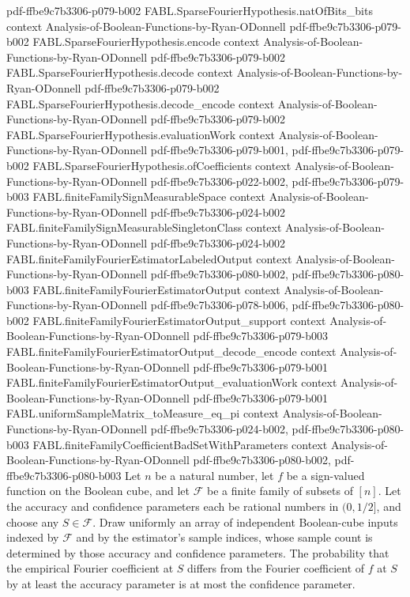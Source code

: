 \begin{theorem}
  {pdf-ffbe9c7b3306-p079-b002}
\proofstep
  {FABL.SparseFourierHypothesis.natOfBits_bits}
  {context}
  {Analysis-of-Boolean-Functions-by-Ryan-ODonnell}
  {pdf-ffbe9c7b3306-p079-b002}
\proofstep
  {FABL.SparseFourierHypothesis.encode}
  {context}
  {Analysis-of-Boolean-Functions-by-Ryan-ODonnell}
  {pdf-ffbe9c7b3306-p079-b002}
\proofstep
  {FABL.SparseFourierHypothesis.decode}
  {context}
  {Analysis-of-Boolean-Functions-by-Ryan-ODonnell}
  {pdf-ffbe9c7b3306-p079-b002}
\proofstep
  {FABL.SparseFourierHypothesis.decode_encode}
  {context}
  {Analysis-of-Boolean-Functions-by-Ryan-ODonnell}
  {pdf-ffbe9c7b3306-p079-b002}
\proofstep
  {FABL.SparseFourierHypothesis.evaluationWork}
  {context}
  {Analysis-of-Boolean-Functions-by-Ryan-ODonnell}
  {pdf-ffbe9c7b3306-p079-b001,
    pdf-ffbe9c7b3306-p079-b002}
\proofstep
  {FABL.SparseFourierHypothesis.ofCoefficients}
  {context}
  {Analysis-of-Boolean-Functions-by-Ryan-ODonnell}
  {pdf-ffbe9c7b3306-p022-b002,
    pdf-ffbe9c7b3306-p079-b003}
\proofstep
  {FABL.finiteFamilySignMeasurableSpace}
  {context}
  {Analysis-of-Boolean-Functions-by-Ryan-ODonnell}
  {pdf-ffbe9c7b3306-p024-b002}
\proofstep
  {FABL.finiteFamilySignMeasurableSingletonClass}
  {context}
  {Analysis-of-Boolean-Functions-by-Ryan-ODonnell}
  {pdf-ffbe9c7b3306-p024-b002}
\proofstep
  {FABL.finiteFamilyFourierEstimatorLabeledOutput}
  {context}
  {Analysis-of-Boolean-Functions-by-Ryan-ODonnell}
  {pdf-ffbe9c7b3306-p080-b002,
    pdf-ffbe9c7b3306-p080-b003}
\proofstep
  {FABL.finiteFamilyFourierEstimatorOutput}
  {context}
  {Analysis-of-Boolean-Functions-by-Ryan-ODonnell}
  {pdf-ffbe9c7b3306-p078-b006,
    pdf-ffbe9c7b3306-p080-b002}
\proofstep
  {FABL.finiteFamilyFourierEstimatorOutput_support}
  {context}
  {Analysis-of-Boolean-Functions-by-Ryan-ODonnell}
  {pdf-ffbe9c7b3306-p079-b003}
\proofstep
  {FABL.finiteFamilyFourierEstimatorOutput_decode_encode}
  {context}
  {Analysis-of-Boolean-Functions-by-Ryan-ODonnell}
  {pdf-ffbe9c7b3306-p079-b001}
\proofstep
  {FABL.finiteFamilyFourierEstimatorOutput_evaluationWork}
  {context}
  {Analysis-of-Boolean-Functions-by-Ryan-ODonnell}
  {pdf-ffbe9c7b3306-p079-b001}
\proofstep
  {FABL.uniformSampleMatrix_toMeasure_eq_pi}
  {context}
  {Analysis-of-Boolean-Functions-by-Ryan-ODonnell}
  {pdf-ffbe9c7b3306-p024-b002,
    pdf-ffbe9c7b3306-p080-b003}
\proofstep
  {FABL.finiteFamilyCoefficientBadSetWithParameters}
  {context}
  {Analysis-of-Boolean-Functions-by-Ryan-ODonnell}
  {pdf-ffbe9c7b3306-p080-b002,
    pdf-ffbe9c7b3306-p080-b003}
Let $n$ be a natural number, let $f$ be a sign-valued function on the Boolean cube, and
let $\mathcal F$ be a finite family of subsets of $[n]$. Let the accuracy and
confidence parameters each be rational numbers in $(0,1/2]$, and choose any
$S\in\mathcal F$. Draw uniformly an array of independent Boolean-cube inputs indexed
by $\mathcal F$ and by the estimator's sample indices, whose sample count is determined
by those accuracy and confidence parameters. The probability that the empirical Fourier
coefficient at $S$ differs from the Fourier coefficient of $f$ at $S$ by at least the
accuracy parameter is at most the confidence parameter.
\end{theorem}

